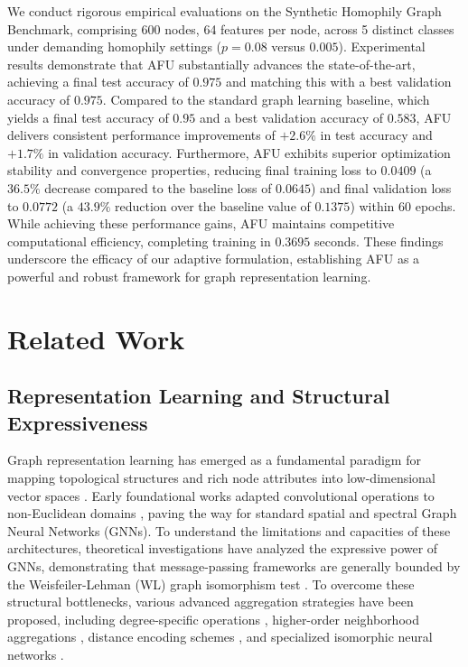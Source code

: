 \documentclass[10pt,twocolumn]{article}
\begin{document}
We conduct rigorous empirical evaluations on the Synthetic Homophily Graph Benchmark, comprising 600 nodes, 64 features per node, across 5 distinct classes under demanding homophily settings ($p=0.08$ versus $0.005$). Experimental results demonstrate that \textsc{AFU} substantially advances the state-of-the-art, achieving a final test accuracy of $0.975$ and matching this with a best validation accuracy of $0.975$. Compared to the standard graph learning baseline, which yields a final test accuracy of $0.95$ and a best validation accuracy of $0.583$, \textsc{AFU} delivers consistent performance improvements of $+2.6\%$ in test accuracy and $+1.7\%$ in validation accuracy. Furthermore, \textsc{AFU} exhibits superior optimization stability and convergence properties, reducing final training loss to $0.0409$ (a $36.5\%$ decrease compared to the baseline loss of $0.0645$) and final validation loss to $0.0772$ (a $43.9\%$ reduction over the baseline value of $0.1375$) within 60 epochs. While achieving these performance gains, \textsc{AFU} maintains competitive computational efficiency, completing training in $0.3695$ seconds. These findings underscore the efficacy of our adaptive formulation, establishing \textsc{AFU} as a powerful and robust framework for graph representation learning.

\section{Related Work}
\subsection{Representation Learning and Structural Expressiveness}

Graph representation learning has emerged as a fundamental paradigm for mapping topological structures and rich node attributes into low-dimensional vector spaces \cite{ref_6, ref_25}. Early foundational works adapted convolutional operations to non-Euclidean domains \cite{ref_17}, paving the way for standard spatial and spectral Graph Neural Networks (GNNs). To understand the limitations and capacities of these architectures, theoretical investigations have analyzed the expressive power of GNNs, demonstrating that message-passing frameworks are generally bounded by the Weisfeiler-Lehman (WL) graph isomorphism test \cite{ref_3}. To overcome these structural bottlenecks, various advanced aggregation strategies have been proposed, including degree-specific operations \cite{ref_5}, higher-order neighborhood aggregations \cite{ref_26}, distance encoding schemes \cite{ref_20}, and specialized isomorphic neural networks \cite{ref_19}. 
\end{document}
